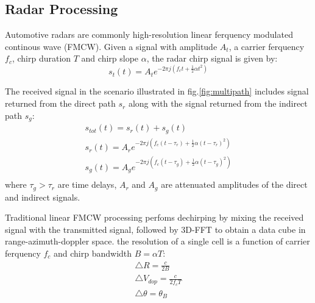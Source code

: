 \documentclass[../main.tex]{subfiles}
\begin{document}
\subsection{Radar Processing}
Automotive radars are commonly high-resolution linear ferquency modulated continous wave (FMCW). Given a signal with amplitude $A_t$, a carrier ferquency $f_c$, chirp duration $T$ and chirp slope $\alpha$, the radar chirp signal is given by:
\begin{equation}
s_t(t) = A_t e^{-2 \pi j(f_c t+\frac{1}{2}\alpha t^2)}
\end{equation} 


The received signal in the scenario illustrated in fig.\ref*{fig:multipath} includes signal returned from the direct path $s_r$ along with the signal returned from the indirect path $s_g$: 
\begin{align}
s_{tot}(t) = s_r(t) + s_g(t) \\
s_r(t) = A_r e^{-2 \pi j(f_c (t-\tau_r)+\frac{1}{2}\alpha (t-\tau_r)^2)} \\
s_g(t) = A_g e^{-2 \pi j(f_c (t-\tau_g)+\frac{1}{2}\alpha (t-\tau_g)^2)} \\
\end{align} 
where $ \tau _g > \tau_r $ are time delays, $A_r$ and $A_g$ are attenuated amplitudes of the direct and indirect signals.\par

Traditional linear FMCW processing perfoms dechirping by mixing the received signal with the transmitted signal, followed by 3D-FFT to obtain a data cube in range-azimuth-doppler space. the resolution of a single cell is a function of carrier ferquency $f_c$ and chirp bandwidth $B = \alpha T$:
\begin{align}
\triangle R = \frac{c}{2B} \\
\triangle V_{dop} = \frac{c}{2f_c T} \\
\triangle \theta = \theta_B \\
\end{align}
\end{document}
